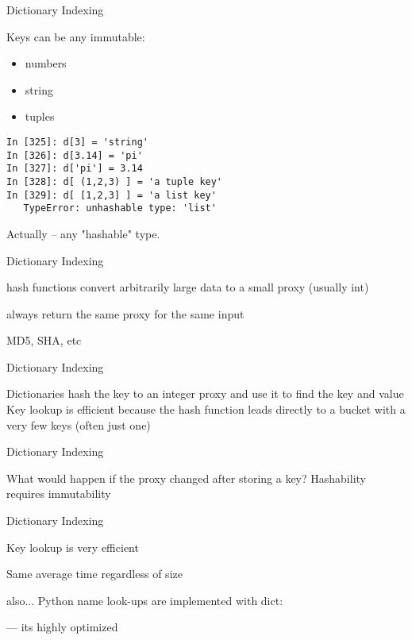 \documentclass{beamer}
\begin{document}
\begin{frame}[fragile]{Dictionary Indexing}

{\Large Keys can be any immutable:}
\begin{itemize}
  \item numbers
  \item string
  \item tuples
\end{itemize}

\begin{verbatim}
In [325]: d[3] = 'string'
In [326]: d[3.14] = 'pi'
In [327]: d['pi'] = 3.14
In [328]: d[ (1,2,3) ] = 'a tuple key'
In [329]: d[ [1,2,3] ] = 'a list key'
   TypeError: unhashable type: 'list'
\end{verbatim}

\vfill
Actually -- any "hashable" type.
\end{frame} 

\begin{frame}[fragile]{Dictionary Indexing}

\vfill
{\Large hash functions convert arbitrarily large data to a small proxy (usually int)

\vfill
always return the same proxy for the same input

\vfill
MD5, SHA, etc
\vfill
}
\end{frame} 

\begin{frame}[fragile]{Dictionary Indexing}

\vfill
{\Large
Dictionaries hash the key to an integer proxy and use it to find the key and value
}
\vfill
{\Large
Key lookup is efficient because the hash function leads directly to a bucket with a very few keys (often just one)
}
\vfill
\end{frame} 

\begin{frame}[fragile]{Dictionary Indexing}

\vfill
{\Large
What would happen if the proxy changed after storing a key?
}
\vfill
{\Large
Hashability requires immutability}
\vfill
\end{frame} 

\begin{frame}[fragile]{Dictionary Indexing}

\vfill
{\Large

Key lookup is very efficient

\vfill
Same average time regardless of size
}

\vfill
also... Python name look-ups are implemented with dict:

 --- its highly optimized
\end{frame} 
\end{document}
